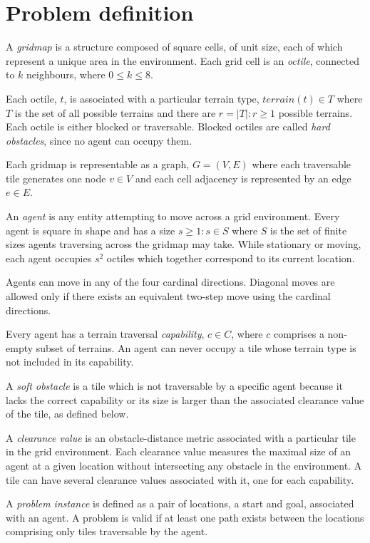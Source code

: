 \section{Problem definition}
A \emph{gridmap} is a structure composed of square cells, of unit size, each of which represent a unique area in the environment. 
Each grid cell is an \emph{octile}, connected to $k$ neighbours, where  $0 \leq k \leq 8$. 
\par \indent
Each octile, $t$, is associated with a particular terrain type, $terrain(t) \in T$ where $T$ is the set of all possible terrains and there are $r = |T| : r \geq 1$ possible terrains.
Each octile is either blocked or traversable. 
Blocked octiles are called \emph{hard obstacles}, since no agent can occupy them.
\par \indent
Each gridmap is representable as a graph, $G = (V, E)$ where each traversable tile generates one node $v \in V$ and each cell adjacency is represented by an edge $e \in E$.
\par \indent
An \emph{agent} is any entity attempting to move across a grid environment. 
Every agent is square in shape and has a size $s \geq 1 : s \in S$ where $S$ is the set of finite sizes agents traversing across the gridmap may take.
While stationary or moving, each agent occupies $s^2$ octiles which together correspond to its current location. 
\par \indent
Agents can move in any of the four cardinal directions. 
Diagonal moves are allowed only if there exists an equivalent two-step move using the cardinal directions.
\par \indent
Every agent has a terrain traversal \emph{capability}, $c \in C$, where $c$ comprises a non-empty subset of terrains.
An agent can never occupy a tile whose terrain type is not included in its capability.
\par \indent 
A \emph{soft obstacle} is a tile which is not traversable by a specific agent because it lacks the correct capability or its size is larger than the associated clearance value of the tile, as defined below. 
\par \indent
A \emph{clearance value} is an obstacle-distance metric associated with a particular tile in the grid environment. 
Each clearance value measures the maximal size of an agent at a given location without intersecting any obstacle in the environment. 
A tile can have several clearance values associated with it, one for each capability. 
\par \indent
A \emph{problem instance} is defined as a pair of locations, a start and goal, associated with an agent. A problem is valid if at least one path exists between the locations comprising only tiles traversable by the agent. 

